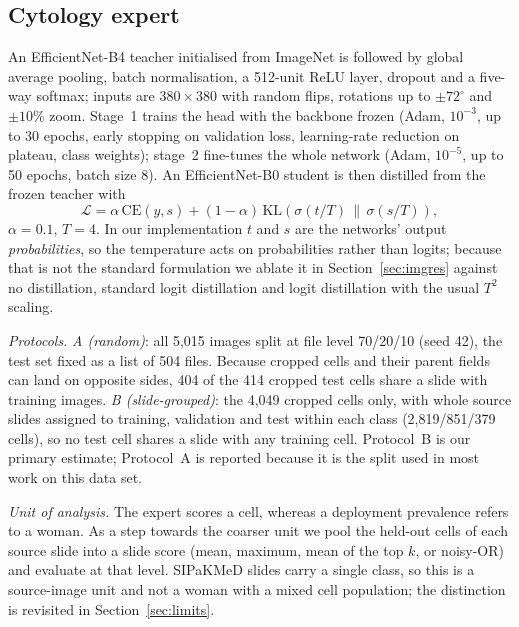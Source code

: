 \documentclass[lettersize,journal]{IEEEtran}
\begin{document}
\subsection{Cytology expert}
\label{sec:image}
An EfficientNet-B4 teacher \cite{tan2019efficientnet} initialised from ImageNet \cite{deng2009imagenet} is followed by global average pooling, batch normalisation, a 512-unit ReLU layer, dropout and a five-way softmax; inputs are $380\times380$ with random flips, rotations up to $\pm72^\circ$ and $\pm10\%$ zoom. Stage~1 trains the head with the backbone frozen (Adam, $10^{-3}$, up to 30 epochs, early stopping on validation loss, learning-rate reduction on plateau, class weights); stage~2 fine-tunes the whole network (Adam, $10^{-5}$, up to 50 epochs, batch size 8). An EfficientNet-B0 student is then distilled from the frozen teacher \cite{hinton2015distilling} with
\begin{equation}
\mathcal L = \alpha\,\mathrm{CE}(y,s) + (1-\alpha)\,\mathrm{KL}\!\left(\sigma(t/T)\,\|\,\sigma(s/T)\right),
\label{eq:kd}
\end{equation}
$\alpha=0.1$, $T=4$. In our implementation $t$ and $s$ are the networks' output \emph{probabilities}, so the temperature acts on probabilities rather than logits; because that is not the standard formulation we ablate it in Section~\ref{sec:imgres} against no distillation, standard logit distillation and logit distillation with the usual $T^2$ scaling.

\emph{Protocols.} \emph{A (random)}: all 5,015 images split at file level 70/20/10 (seed 42), the test set fixed as a list of 504 files. Because cropped cells and their parent fields can land on opposite sides, 404 of the 414 cropped test cells share a slide with training images. \emph{B (slide-grouped)}: the 4,049 cropped cells only, with whole source slides assigned to training, validation and test within each class (2,819/851/379 cells), so no test cell shares a slide with any training cell. Protocol~B is our primary estimate; Protocol~A is reported because it is the split used in most work on this data set.

\emph{Unit of analysis.} The expert scores a cell, whereas a deployment prevalence refers to a woman. As a step towards the coarser unit we pool the held-out cells of each source slide into a slide score (mean, maximum, mean of the top $k$, or noisy-OR) and evaluate at that level. SIPaKMeD slides carry a single class, so this is a source-image unit and not a woman with a mixed cell population; the distinction is revisited in Section~\ref{sec:limits}.
\end{document}

